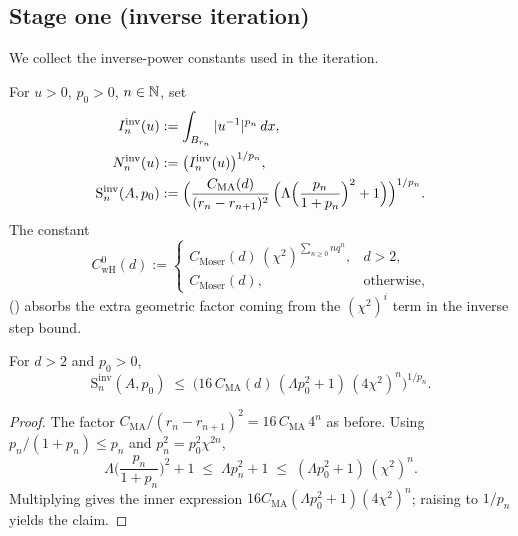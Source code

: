 \subsection{Stage one (inverse iteration)}

We collect the inverse-power constants used in the iteration.

\begin{definition}
\label{def:superIterIntegralInv}
\leanok
{}
For $u>0$, $p_0 > 0$, $n \in \mathbb{N}$, set
\begin{align*}
  I_n^{\mathrm{inv}}(u) &:= \int_{B_{r_n}} |u^{-1}|^{p_n}\,dx, \\
  N_n^{\mathrm{inv}}(u) &:= \big(I_n^{\mathrm{inv}}(u)\big)^{1/p_n}, \\
  \mathrm{S}_n^{\mathrm{inv}}(A,p_0) &:=
   \Big(\frac{C_{\mathrm{MA}}(d)}{(r_n-r_{n+1})^{2}}\,
     \Big(\Lambda\Big(\frac{p_n}{1+p_n}\Big)^{2}+1\Big)\Big)^{1/p_n}.
\end{align*}
The constant
\begin{equation*}
  C_{\mathrm{wH}}^{0}(d) :=
  \begin{cases}
    C_{\mathrm{Moser}}(d)\,(\chi^{2})^{\sum_{n\geq 0} n q^{n}}, & d > 2,\\
    C_{\mathrm{Moser}}(d), & \text{otherwise},
  \end{cases}
\end{equation*}
() absorbs the extra geometric factor coming from the
$(\chi^{2})^{i}$ term in the inverse step bound.
\end{definition}

\begin{lemma}
\label{lem:stepInv-le}
\leanok
{}
For $d>2$ and $p_0 > 0$,
\begin{equation*}
  \mathrm{S}_n^{\mathrm{inv}}(A,p_0)
  \;\leq\;
  \Big(16\,C_{\mathrm{MA}}(d)\,(\Lambda p_0^{2}+1)\,(4\chi^{2})^{n}\Big)^{1/p_n}.
\end{equation*}
\end{lemma}

\begin{proof}
\leanok
{}

The factor $C_{\mathrm{MA}}/(r_n - r_{n+1})^{2} = 16\,C_{\mathrm{MA}}\,4^{n}$ as
before. Using $p_n/(1+p_n) \leq p_n$ and $p_n^{2} = p_0^{2}\chi^{2n}$,
\begin{equation*}
  \Lambda\Big(\frac{p_n}{1+p_n}\Big)^{2}+1
  \;\leq\; \Lambda p_n^{2}+1
  \;\leq\; (\Lambda p_0^{2}+1)\,(\chi^{2})^{n}.
\end{equation*}
Multiplying gives the inner expression $16 C_{\mathrm{MA}}(\Lambda p_0^{2}+1)
(4\chi^{2})^{n}$; raising to $1/p_n$ yields the claim.
\end{proof}

